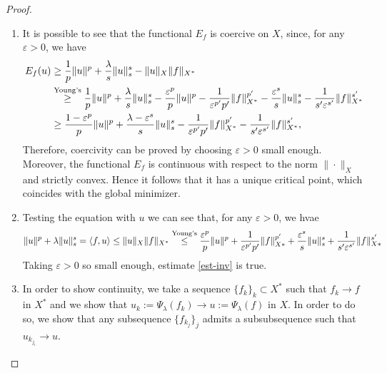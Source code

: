 \documentclass[11pt,reqno]{amsart}
\theoremstyle{definition}
\numberwithin{equation}{section}
\numberwithin{theorem}{section}
\numberwithin{equation}{section}
\numberwithin{theorem}{section}
\newcommand{\R}{\mathbb{R}}
\newcommand{\raj}[1]{{\textcolor{magenta}{#1}}} %
\begin{document}
\begin{proof}
\begin{enumerate} 

\item It is possible to see that the functional $E_f$ is coercive on $X$, since, for any $\varepsilon>0$, we have
\begin{equation}\notag
\begin{aligned}
E_f(u)&\ge \frac{1}{p}\|u\|^p+\frac{\lambda}{s}\|u\|^s_s-\|u\|_X\|f\|_{X^*}  \\
&\stackrel{\text{Young's}}{\ge}\frac{1}{p}\|u\|^p+\frac{\lambda}{s}\|u\|^s_s-\frac{\varepsilon^p}{p}\|u\|^p-\frac{1}{\varepsilon^{p'}p'}\|f\|^{p'}_{X^*}-\frac{\varepsilon^s}{s}\|u\|^s_s-\frac{1}{s'\varepsilon^{s'}}\|f\|^{s'}_{X^*}\\
&\ge\frac{1-\varepsilon^p}{p}\|u\|^p+\frac{\lambda-\varepsilon^s}{s}\|u\|^s_s-\frac{1}{\varepsilon^{p'}p'}\|f\|^{p'}_{X^*}-\frac{1}{s'\varepsilon^{s'}}\|f\|^{s'}_{X^*},
\end{aligned}   
\end{equation}
Therefore, coercivity can be proved by choosing $\varepsilon>0$ small enough.\\ %

Moreover, the functional $E_f$ is continuous with respect to the norm $\|\cdotp\|_X$ and strictly convex. Hence it follows that it has a unique critical point, which coincides with the global minimizer.

\item Testing the equation with $u$ we can see that, for any $\varepsilon>0$, we hvae
\begin{equation}\notag
\|u\|^p+\lambda\|u\|_s^s=\langle f,u\rangle\le\|u\|_X\|f\|_{X^*}
\stackrel{\text{Young's}}{\le} \frac{\varepsilon^p}{p}\|u\|^p+\frac{1}{\varepsilon^{p'}p'}\|f\|_{X*}^{p'}+\frac{\varepsilon^s}{s}\|u\|^s_s+\frac{1}{s'\varepsilon^{s'}}\|f\|_{X*}^{s'}
\end{equation}
Taking $\varepsilon>0$ so small enough, estimate \eqref{est-inv} is true.

\item In order to show continuity, we take a sequence $\{f_k\}_{k}\subset X^*$ such that $f_k\to f$ in $X^*$ and we show that $u_k:=\Psi_\lambda(f_k)\to u:=\Psi_\lambda(f)$ in $X$. In order to do so, we show that any subsequence $\{f_{k_j}\}_j$ admits a subsubsequence such that $u_{k_{j_i}}\to u$.\\


\end{enumerate}
\end{proof}
\end{document}
